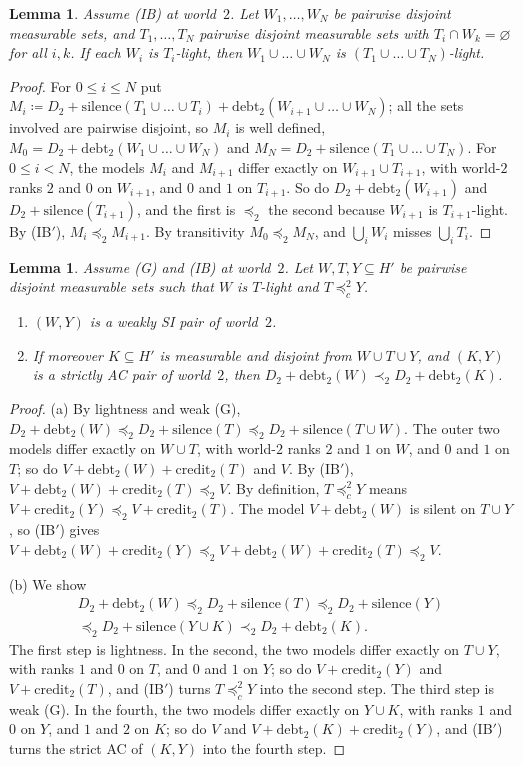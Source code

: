 \documentclass[11pt]{article}
\newtheorem{lemma}[theorem]{Lemma}
\theoremstyle{definition}\newtheorem{definition}[theorem]{Definition}
\theoremstyle{remark}\newtheorem{remark}[theorem]{Remark}
\newcommand{\debt}{\mathrm{debt}}
\newcommand{\cred}{\mathrm{credit}}
\newcommand{\sil}{\mathrm{silence}}
\begin{document}
\begin{lemma}\label{lem:compose}
Assume (IB) at world~$2$. Let $W_1,\dots,W_N$ be pairwise disjoint
measurable sets, and $T_1,\dots,T_N$ pairwise disjoint measurable sets with
$T_i\cap W_k=\varnothing$ for all $i,k$. If each $W_i$ is $T_i$-light, then
$W_1\cup\dots\cup W_N$ is $(T_1\cup\dots\cup T_N)$-light.
\end{lemma}
\begin{proof}
For $0\le i\le N$ put
$M_i\coloneqq D_2+\sil(T_1\cup\dots\cup T_i)+\debt_2(W_{i+1}\cup\dots\cup
W_N)$; all the sets involved are pairwise disjoint, so $M_i$ is well
defined, $M_0=D_2+\debt_2(W_1\cup\dots\cup W_N)$ and
$M_N=D_2+\sil(T_1\cup\dots\cup T_N)$. For $0\le i<N$, the models $M_i$ and
$M_{i+1}$ differ exactly on $W_{i+1}\cup T_{i+1}$, with world-$2$ ranks $2$
and $0$ on $W_{i+1}$, and $0$ and $1$ on $T_{i+1}$. So do
$D_2+\debt_2(W_{i+1})$ and $D_2+\sil(T_{i+1})$, and the first is
$\preceq_2$ the second because $W_{i+1}$ is $T_{i+1}$-light. By (IB$'$),
$M_i\preceq_2M_{i+1}$. By transitivity $M_0\preceq_2M_N$, and
$\bigcup_iW_i$ misses $\bigcup_iT_i$.
\end{proof}

\begin{lemma}\label{lem:buys}
Assume (G) and (IB) at world~$2$. Let $W,T,Y\subseteq H'$ be pairwise
disjoint measurable sets such that $W$ is $T$-light and $T\preceq^2_cY$.
\begin{enumerate}[label=(\alph*),leftmargin=*,itemsep=2pt]
\item $(W,Y)$ is a weakly SI pair of world~$2$.
\item If moreover $K\subseteq H'$ is measurable and disjoint from
$W\cup T\cup Y$, and $(K,Y)$ is a strictly AC pair of world~$2$, then
$D_2+\debt_2(W)\prec_2D_2+\debt_2(K)$.
\end{enumerate}
\end{lemma}
\begin{proof}
(a) By lightness and weak (G),
$D_2+\debt_2(W)\preceq_2D_2+\sil(T)\preceq_2D_2+\sil(T\cup W)$. The outer
two models differ exactly on $W\cup T$, with world-$2$ ranks $2$ and $1$ on
$W$, and $0$ and $1$ on $T$; so do $V+\debt_2(W)+\cred_2(T)$ and $V$. By
(IB$'$), $V+\debt_2(W)+\cred_2(T)\preceq_2V$. By definition, $T\preceq^2_cY$
means $V+\cred_2(Y)\preceq_2V+\cred_2(T)$. The model $V+\debt_2(W)$ is silent
on $T\cup Y$, so (IB$'$) gives
$V+\debt_2(W)+\cred_2(Y)\preceq_2V+\debt_2(W)+\cred_2(T)\preceq_2V$.

(b) We show
\begin{multline*}
 D_2+\debt_2(W)\preceq_2D_2+\sil(T)\preceq_2D_2+\sil(Y)\\
 \preceq_2D_2+\sil(Y\cup K)\prec_2D_2+\debt_2(K).
\end{multline*}
The first step is lightness. In the second, the two models differ exactly on
$T\cup Y$, with ranks $1$ and $0$ on $T$, and $0$ and $1$ on $Y$; so do
$V+\cred_2(Y)$ and $V+\cred_2(T)$, and (IB$'$) turns $T\preceq^2_cY$ into
the second step. The third step is weak (G). In the fourth, the two models
differ exactly on $Y\cup K$, with ranks $1$ and $0$ on $Y$, and $1$ and $2$
on $K$; so do $V$ and $V+\debt_2(K)+\cred_2(Y)$, and (IB$'$) turns the strict
AC of $(K,Y)$ into the fourth step.
\end{proof}
\end{document}
